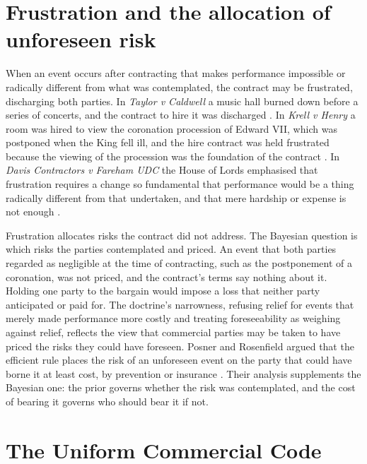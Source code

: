 \section{Frustration and the allocation of unforeseen risk}

When an event occurs after contracting that makes performance impossible or radically different from what was contemplated, the contract may be frustrated, discharging both parties. In \emph{Taylor v Caldwell} a music hall burned down before a series of concerts, and the contract to hire it was discharged \citep{taylor1863}. In \emph{Krell v Henry} a room was hired to view the coronation procession of Edward VII, which was postponed when the King fell ill, and the hire contract was held frustrated because the viewing of the procession was the foundation of the contract \citep{krell1903}. In \emph{Davis Contractors v Fareham UDC} the House of Lords emphasised that frustration requires a change so fundamental that performance would be a thing radically different from that undertaken, and that mere hardship or expense is not enough \citep{davis1956}.

Frustration allocates risks the contract did not address. The Bayesian question is which risks the parties contemplated and priced. An event that both parties regarded as negligible at the time of contracting, such as the postponement of a coronation, was not priced, and the contract's terms say nothing about it. Holding one party to the bargain would impose a loss that neither party anticipated or paid for. The doctrine's narrowness, refusing relief for events that merely made performance more costly and treating foreseeability as weighing against relief, reflects the view that commercial parties may be taken to have priced the risks they could have foreseen. Posner and Rosenfield argued that the efficient rule places the risk of an unforeseen event on the party that could have borne it at least cost, by prevention or insurance \citep{posner1977}. Their analysis supplements the Bayesian one: the prior governs whether the risk was contemplated, and the cost of bearing it governs who should bear it if not.

\section{The Uniform Commercial Code}

